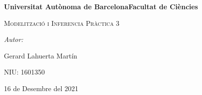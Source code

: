 \documentclass[12pt]{article}
\begin{document}
\begin{titlepage}
    \centering
    \vspace{4cm}
    {\bfseries\LARGE Universitat Autònoma de Barcelona\newline Facultat de Ciències\par}
    \vspace{6cm}
    {\scshape\Huge Modelització i Inferencia Pràctica 3 \par} 
    \vspace{2cm}
    {\Large \itshape Autor: \par}
    {\Large Gerard Lahuerta Martín\par}
    {\small NIU: 1601350\par}
    \vspace{3cm}
    {\Large 16 de Desembre del 2021\par}
\end{titlepage}

\justifying


\newpage
\setcounter{page}{2}
\pagestyle{plain}
\tableofcontents
\cleardoublepage
{}
\end{document}
